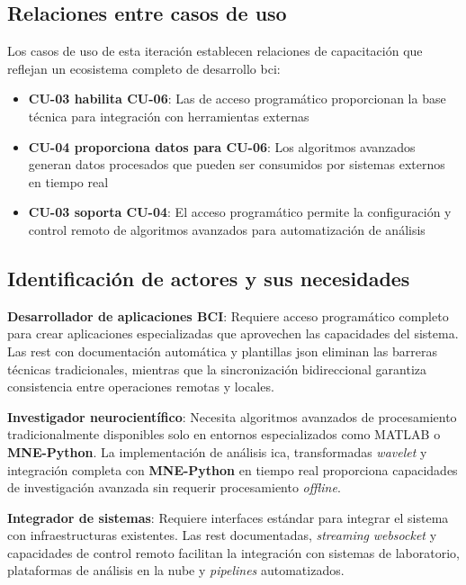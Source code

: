\subsection{Relaciones entre casos de uso}
\label{subsec:relaciones_casos_uso_it3}

Los casos de uso de esta iteración establecen relaciones de capacitación que reflejan un ecosistema completo de desarrollo \acrshort{bci}:

\begin{itemize}
    \item \textbf{CU-03 habilita CU-06}: Las  de acceso programático proporcionan la base técnica para integración con herramientas externas
    \item \textbf{CU-04 proporciona datos para CU-06}: Los algoritmos avanzados generan datos procesados que pueden ser consumidos por sistemas externos en tiempo real
    \item \textbf{CU-03 soporta CU-04}: El acceso programático permite la configuración y control remoto de algoritmos avanzados para automatización de análisis
\end{itemize}

\subsection{Identificación de actores y sus necesidades}
\label{subsec:actores_necesidades_it3}

\textbf{Desarrollador de aplicaciones BCI}: Requiere acceso programático completo para crear aplicaciones especializadas que aprovechen las capacidades del sistema. Las  \acrshort{rest} con documentación automática y plantillas \acrshort{json} eliminan las barreras técnicas tradicionales, mientras que la sincronización bidireccional garantiza consistencia entre operaciones remotas y locales.

\textbf{Investigador neurocientífico}: Necesita algoritmos avanzados de procesamiento tradicionalmente disponibles solo en entornos especializados como MATLAB o \textbf{MNE-Python}. La implementación de análisis \acrshort{ica}, transformadas \textit{\gls{wavelet}} y integración completa con \textbf{MNE-Python} en tiempo real proporciona capacidades de investigación avanzada sin requerir procesamiento \textit{offline}.

\textbf{Integrador de sistemas}: Requiere interfaces estándar para integrar el sistema con infraestructuras existentes. Las  \acrshort{rest} documentadas, \textit{\gls{streaming}} \textit{\gls{websocket}} y capacidades de control remoto facilitan la integración con sistemas de laboratorio, plataformas de análisis en la nube y \textit{\glspl{pipeline}} automatizados.

